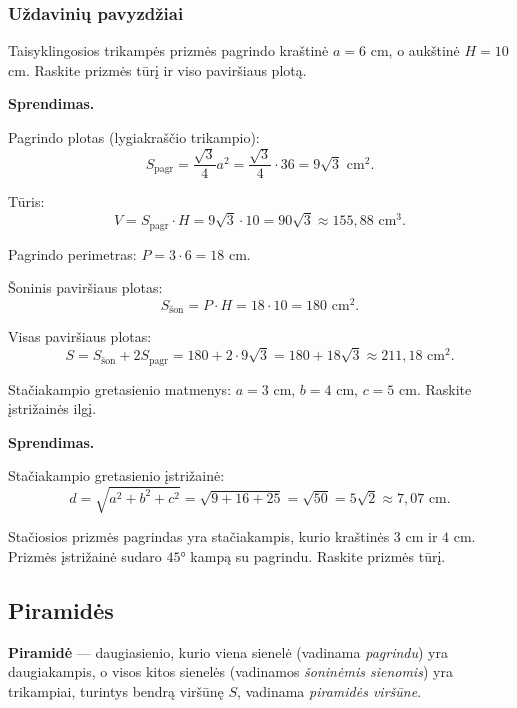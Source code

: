 \subsubsection*{Uždavinių pavyzdžiai}

\begin{example}
Taisyklingosios trikampės prizmės pagrindo kraštinė $a = 6$ cm, o aukštinė $H = 10$ cm. Raskite prizmės tūrį ir viso paviršiaus plotą.

\textbf{Sprendimas.}

Pagrindo plotas (lygiakraščio trikampio):
\[
    S_{\text{pagr}} = \frac{\sqrt{3}}{4} a^2 = \frac{\sqrt{3}}{4} \cdot 36 = 9\sqrt{3} \text{ cm}^2.
\]

Tūris:
\[
    V = S_{\text{pagr}} \cdot H = 9\sqrt{3} \cdot 10 = 90\sqrt{3} \approx 155{,}88 \text{ cm}^3.
\]

Pagrindo perimetras: $P = 3 \cdot 6 = 18$ cm.

Šoninis paviršiaus plotas:
\[
    S_{\text{šon}} = P \cdot H = 18 \cdot 10 = 180 \text{ cm}^2.
\]

Visas paviršiaus plotas:
\[
    S = S_{\text{šon}} + 2S_{\text{pagr}} = 180 + 2 \cdot 9\sqrt{3} = 180 + 18\sqrt{3} \approx 211{,}18 \text{ cm}^2.
\]
\end{example}

\begin{example}
Stačiakampio gretasienio matmenys: $a = 3$ cm, $b = 4$ cm, $c = 5$ cm. Raskite įstrižainės ilgį.

\textbf{Sprendimas.}

Stačiakampio gretasienio įstrižainė:
\[
    d = \sqrt{a^2 + b^2 + c^2} = \sqrt{9 + 16 + 25} = \sqrt{50} = 5\sqrt{2} \approx 7{,}07 \text{ cm}.
\]
\end{example}

\begin{exercise}
Stačiosios prizmės pagrindas yra stačiakampis, kurio kraštinės $3$ cm ir $4$ cm. Prizmės įstrižainė sudaro $45°$ kampą su pagrindu. Raskite prizmės tūrį.
\end{exercise}

\subsection{Piramidės}

\begin{definition}
\textbf{Piramidė} --- daugiasienio, kurio viena sienelė (vadinama \textit{pagrindu}) yra daugiakampis, o visos kitos sienelės (vadinamos \textit{šoninėmis sienomis}) yra trikampiai, turintys bendrą viršūnę $S$, vadinama \textit{piramidės viršūne}.
\end{definition}

